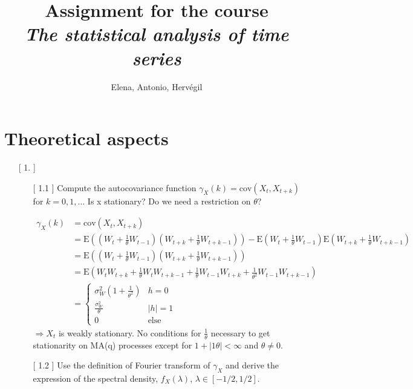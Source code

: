 \documentclass[10pt,a4paper]{article}
\author{Elena, Antonio, Hervégil}
\title{Assignment for the course \\ \textit{The statistical analysis of time series}}
\begin{document}
	\maketitle
	\newpage
	\section{Theoretical aspects}
	\begin{enumerate}
	\item[[ 1.]] \begin{enumerate}
			\item[[ 1.1]] Compute the autocovariance function $\gamma_{X} (k) = \text{cov}(X_t,X_{t+k})$ for $k=0,1,\dots$ Is { \selectfont \large  x } stationary? Do we need a restriction on $\theta$?
			
			\begin{align*}
				\gamma_{X}(k) &= \text{cov}(X_t,X_{t+k}) \\
				&= \text{E}((W_t+\frac{1}{\theta} W_{t-1})(W_{t+k}+\frac{1}{\theta}W_{t+k-1})) - \text{E}(W_t+\frac{1}{\theta} W_{t-1})\text{E}(W_{t+k}+\frac{1}{\theta}W_{t+k-1}) \\
				&= \text{E}((W_t+\frac{1}{\theta} W_{t-1})(W_{t+k}+\frac{1}{\theta}W_{t+k-1})) \\
				&= \text{E}(W_tW_{t+k} + \frac{1}{\theta} W_tW_{t+k-1}+\frac{1}{\theta} W_{t-1}W_{t+k} + \frac{1}{\theta^2} W_{t-1}W_{t+k-1}) \\
				&= 	\left\{
							\begin{array}{ll}
								\sigma^2_{W} (1+\frac{1}{\theta^2}) & h=0\\
								\frac{\sigma^2_{W}}{\theta} & |h|=1\\
								0 & \text{else}
							\end{array}
					\right.			
			\end{align*}		
			$\Rightarrow X_{t}$ is weakly stationary. No conditions for $\frac{1}{\theta}$ necessary to get stationarity on MA(q) processes except for $1+|1\theta| < \infty$ and $\theta \neq 0$.
			
			
			
			\item[[ 1.2]] Use the definition of Fourier transform of $\gamma_X$ and derive the expression of the spectral density, $f_X(\lambda)$, $\lambda \in \left[-1/2,1/2\right]$.
			

\end{enumerate}
\end{enumerate}
\end{document}
